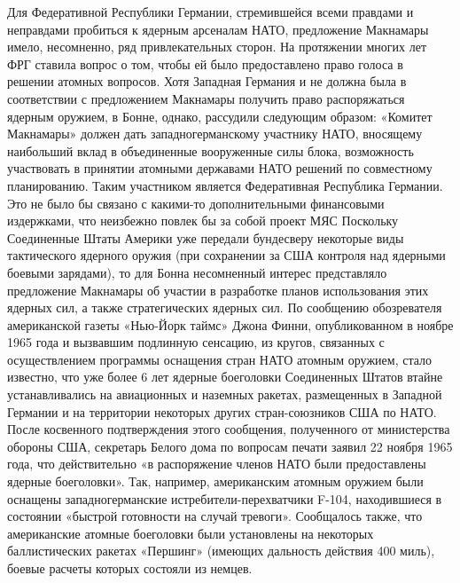 \documentclass[12pt, a4paper, openany]{book}
\begin{document}
	Для Федеративной Республики Германии, стремившейся всеми правдами и неправдами пробиться к ядерным арсеналам НАТО, предложение Макнамары имело, несомненно, ряд привлекательных сторон. На протяжении многих лет ФРГ ставила вопрос о том, чтобы ей было предоставлено право голоса в решении атомных вопросов. Хотя Западная Германия и не должна была в соответствии с предложением Макнамары получить право распоряжаться ядерным оружием, в Бонне, однако, рассудили следующим образом: «Комитет Макнамары» должен дать западногерманскому участнику НАТО, вносящему наибольший вклад в объединенные вооруженные силы блока, возможность участвовать в принятии атомными державами НАТО решений по совместному планированию. Таким участником является Федеративная Республика Германии. Это не было бы связано с какими-то дополнительными финансовыми издержками, что неизбежно повлек бы за собой проект МЯС Поскольку Соединенные Штаты Америки уже передали бундесверу некоторые виды тактического ядерного оружия (при сохранении за США контроля над ядерными боевыми зарядами), то для Бонна несомненный интерес представляло предложение Макнамары об участии в разработке планов использования этих ядерных сил, а также стратегических ядерных сил. По сообщению обозревателя американской газеты «Нью-Йорк таймс» Джона Финни, опубликованном в ноябре 1965 года и вызвавшим подлинную сенсацию, из кругов, связанных с осуществлением программы оснащения стран НАТО атомным оружием, стало известно, что уже более 6 лет ядерные боеголовки Соединенных Штатов втайне устанавливались на авиационных и наземных ракетах, размещенных в Западной Германии и на территории некоторых других стран-союзников США по НАТО. После косвенного подтверждения этого сообщения, полученного от министерства обороны США, секретарь Белого дома по вопросам печати заявил 22 ноября 1965 года, что действительно «в распоряжение членов НАТО были предоставлены ядерные боеголовки». Так, например, американским атомным оружием были оснащены западногерманские истребители-перехватчики F-104, находившиеся в состоянии «быстрой готовности на случай тревоги». Сообщалось также, что американские атомные боеголовки были установлены на некоторых баллистических ракетах «Першинг» (имеющих дальность действия 400 миль), боевые расчеты которых состояли из немцев.
	
\end{document}
